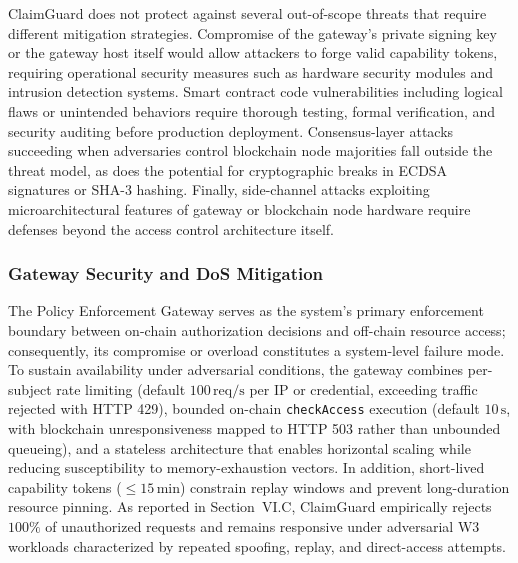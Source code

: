 \documentclass[final,5p,times,twocolumn]{elsarticle}
\begin{document}
ClaimGuard does not protect against several out-of-scope threats that require different mitigation strategies. Compromise of the gateway's private signing key or the gateway host itself would allow attackers to forge valid capability tokens, requiring operational security measures such as hardware security modules and intrusion detection systems. Smart contract code vulnerabilities including logical flaws or unintended behaviors require thorough testing, formal verification, and security auditing before production deployment. Consensus-layer attacks succeeding when adversaries control blockchain node majorities fall outside the threat model, as does the potential for cryptographic breaks in ECDSA signatures or SHA-3 hashing. Finally, side-channel attacks exploiting microarchitectural features of gateway or blockchain node hardware require defenses beyond the access control architecture itself.

\subsubsection{Gateway Security and DoS Mitigation}
The Policy Enforcement Gateway serves as the system’s primary enforcement boundary between on-chain authorization decisions and off-chain resource access; consequently, its compromise or overload constitutes a system-level failure mode. To sustain availability under adversarial conditions, the gateway combines per-subject rate limiting (default \(100\,\mathrm{req/s}\) per IP or credential, exceeding traffic rejected with HTTP 429), bounded on-chain \texttt{checkAccess} execution (default \(10\,\mathrm{s}\), with blockchain unresponsiveness mapped to HTTP 503 rather than unbounded queueing), and a stateless architecture that enables horizontal scaling while reducing susceptibility to memory-exhaustion vectors. In addition, short-lived capability tokens (\(\leq 15\,\mathrm{min}\)) constrain replay windows and prevent long-duration resource pinning. As reported in Section~VI.C, ClaimGuard empirically rejects \(100\%\) of unauthorized requests and remains responsive under adversarial W3 workloads characterized by repeated spoofing, replay, and direct-access attempts.



\end{document}
